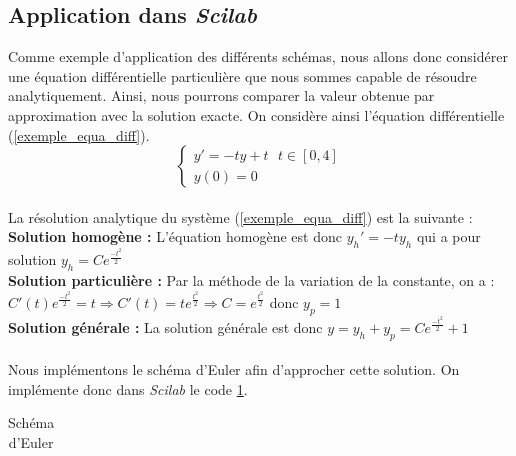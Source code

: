 \documentclass[a4paper,10pt]{report}
\begin{document}
\subsection{Application dans \textit{Scilab}}
Comme exemple d'application des différents schémas, nous allons donc considérer une équation différentielle particulière que nous sommes capable de résoudre analytiquement. Ainsi, nous pourrons comparer la valeur obtenue par approximation avec la solution exacte. On considère ainsi l'équation différentielle (\ref{exemple_equa_diff}).
\begin{equation}
\label{exemple_equa_diff}
\left\lbrace
\begin{array}{l}
y'=-ty+t \ \ \ t \in [0,4] \\
y(0)=0
\end{array}\right.
\end{equation} \\
La résolution analytique du système (\ref{exemple_equa_diff}) est la suivante :\\
\textbf{Solution homogène :} L'équation homogène est donc $y_h'=-ty_h$ qui a pour solution $y_h=Ce^{\frac{-t^2}{2}}$\\
\textbf{Solution particulière :} Par la méthode de la variation de la constante, on a :\\$C'(t)e^{\frac{-t^2}{2}}=t \Rightarrow C'(t)=te^{\frac{t^2}{2} } \Rightarrow C=e^{\frac{t^2}{2} }$ donc $y_p=1$\\
\textbf{Solution générale :} La solution générale est donc $y=y_h+y_p=Ce^{\frac{-t^2}{2}}+1$\\ \\

\indent Nous implémentons le schéma d'Euler afin d'approcher cette solution. On implémente donc dans \textit{Scilab} le code \ref{code_euler}.
\begin{table}[H]
\caption{Schéma d'Euler}
\begin{tabular}{l}

\label{code_euler}
\end{tabular}
\end{table}
\end{document}
